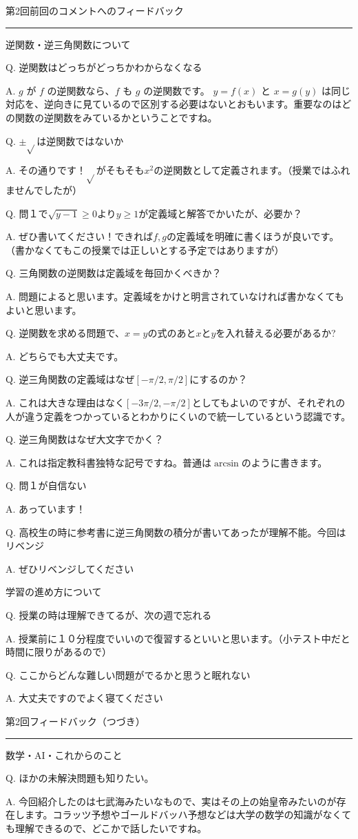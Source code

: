 \documentclass[a4paper,10pt,pdflatex,ja=standard,jafont=ipaex-type1,
  magstyle=real,scale=1]{bxjsarticle}
\newcommand{\coursename}{解析学 II}
\newcommand{\handoutnumber}{2}
\newcommand{\handouttitle}[1]{%
  \begin{center}
    {\Large\color{ink}#1}\par\vspace{3mm}
    {\color{accent}\rule{0.88\linewidth}{0.7pt}}
  \end{center}\vspace{-2mm}}
\newcommand{\handout}[2]{%
  \renewcommand{\handoutnumber}{#1}%
  \handouttitle{第#1回\quad #2}}
\newcommand{\topic}[1]{\par\vspace{5pt}%
  {\large\sffamily\mdseries\color{accent}#1}\par\vspace{2pt}}
\newcommand{\feedback}[2]{%
  \par\addvspace{5pt}\noindent\begin{minipage}{\linewidth}%
  {\color{ink}Q. #1}\par\vspace{1pt}%
  {\color{accent}A. }#2%
  \end{minipage}\par}
\begin{document}
\fontsize{10pt}{13.5pt}\selectfont
\setlength{\abovedisplayskip}{4pt}
\setlength{\belowdisplayskip}{4pt}

\fancyhead[L]{\small\color{ink}\coursename{}・フィードバック}
\handout{2}{前回のコメントへのフィードバック}
\topic{逆関数・逆三角関数について}

\feedback{逆関数はどっちがどっちかわからなくなる}{%
$g$ が $f$ の逆関数なら、$f$ も $g$ の逆関数です。
$y=f(x)$ と $x=g(y)$ は同じ対応を、逆向きに見ているので区別する必要はないとおもいます。重要なのはどの関数の逆関数をみているかということですね。
}

\feedback{$\pm \sqrt{}$は逆関数ではないか}{%
その通りです！$\sqrt{}$がそもそも$x^2$の逆関数として定義されます。（授業ではふれませんでしたが）}

\feedback{問１で$\sqrt{y-1}\geq 0$より$y\geq 1$が定義域と解答でかいたが、必要か？}{%
ぜひ書いてください！できれば$f,g$の定義域を明確に書くほうが良いです。（書かなくてもこの授業では正しいとする予定ではありますが）}

\feedback{三角関数の逆関数は定義域を毎回かくべきか？}{%
問題によると思います。定義域をかけと明言されていなければ書かなくてもよいと思います。}

\feedback{逆関数を求める問題で、$x=y$の式のあと$x$と$y$を入れ替える必要があるか?}{%
どちらでも大丈夫です。}

\feedback{逆三角関数の定義域はなぜ$[-\pi/2,\pi/2]$にするのか？}{%
これは大きな理由はなく$[-3\pi/2,-\pi/2]$としてもよいのですが、それぞれの人が違う定義をつかっているとわかりにくいので統一しているという認識です。}

\feedback{逆三角関数はなぜ大文字でかく？}{%
これは指定教科書独特な記号ですね。普通は$\arcsin$のように書きます。}

\feedback{問１が自信ない}{%
あっています！}

\feedback{高校生の時に参考書に逆三角関数の積分が書いてあったが理解不能。今回はリベンジ}{%
ぜひリベンジしてください}

\topic{学習の進め方について}
\feedback{授業の時は理解できてるが、次の週で忘れる}{%
授業前に１０分程度でいいので復習するといいと思います。（小テスト中だと時間に限りがあるので）}

\feedback{ここからどんな難しい問題がでるかと思うと眠れない}{%
大丈夫ですのでよく寝てください}

\newpage
\handouttitle{第2回\quad フィードバック（つづき）}
\topic{数学・AI・これからのこと}

\feedback{ほかの未解決問題も知りたい。}{%
今回紹介したのは七武海みたいなもので、実はその上の始皇帝みたいのが存在します。コラッツ予想やゴールドバッハ予想などは大学の数学の知識がなくても理解できるので、どこかで話したいですね。}
\end{document}

